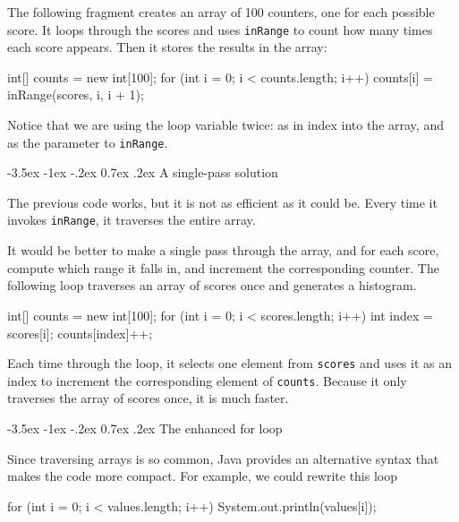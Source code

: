 \documentclass[12pt]{book}
\makeatletter
\theoremstyle{exercise}
\newcommand{\java}[1]{\verb"#1"}
\renewcommand{\section}{\@startsection{section}{1}{\z@}%
    {-3.5ex \@plus -1ex \@minus -.2ex}%
    {0.7ex \@plus.2ex}%
    {\normalfont\Large\bfseries}}
\newcommand{\java}[1]{\lstinline{#1}} %
\makeatother
\begin{document}
The following fragment creates an array of 100 counters, one for each possible score.
It loops through the scores and uses \java{inRange} to count how many times each score appears.
Then it stores the results in the array:

\begin{code}
    int[] counts = new int[100];
    for (int i = 0; i < counts.length; i++) {
        counts[i] = inRange(scores, i, i + 1);
    }
\end{code}

Notice that we are using the loop variable twice: as in index into the array, and as the parameter to \java{inRange}.


\section{A single-pass solution}
\label{singlepass}

The previous code works, but it is not as efficient as it could be.
Every time it invokes \java{inRange}, it traverses the entire array.

It would be better to make a single pass through the array, and for each score, compute which range it falls in, and increment the corresponding counter.
The following loop traverses an array of scores once and generates a histogram.

\begin{code}
    int[] counts = new int[100];
    for (int i = 0; i < scores.length; i++) {
        int index = scores[i];
        counts[index]++;
    }
\end{code}

Each time through the loop, it selects one element from \java{scores} and uses it as an index to increment the corresponding element of \java{counts}.
Because it only traverses the array of scores once, it is much faster.


\section{The enhanced for loop}
\label{enhanced}

Since traversing arrays is so common, Java provides an alternative syntax that makes the code more compact.
For example, we could rewrite this loop

\begin{code}
    for (int i = 0; i < values.length; i++) {
        System.out.println(values[i]);
    }
\end{code}
\end{document}
